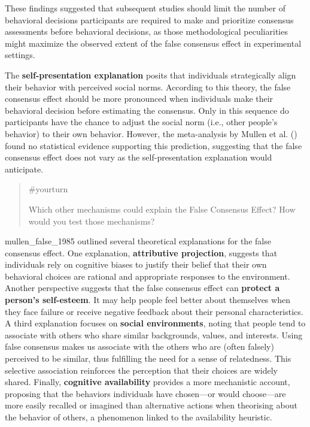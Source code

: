\documentclass[
  letterpaper,
]{book}
\begin{document}
These findings suggested that subsequent studies should limit the number
of behavioral decisions participants are required to make and prioritize
consensus assessments before behavioral decisions, as those
methodological peculiarities might maximize the observed extent of the
false consensus effect in experimental settings.

The \textbf{self-presentation explanation} posits that individuals
strategically align their behavior with perceived social norms.
According to this theory, the false consensus effect should be more
pronounced when individuals make their behavioral decision before
estimating the consensus. Only in this sequence do participants have the
chance to adjust the social norm (i.e., other people's behavior) to
their own behavior. However, the meta-analysis by Mullen et al.
() found no statistical evidence
supporting this prediction, suggesting that the false consensus effect
does not vary as the self-presentation explanation would anticipate.

\begin{quote}
{\#yourturn}

Which other mechanisms could explain the False Consensus Effect? How
would you test those mechanisms?
\end{quote}

mullen\_false\_1985 outlined several theoretical explanations for the
false consensus effect. One explanation, \textbf{attributive
projection}, suggests that individuals rely on cognitive biases to
justify their belief that their own behavioral choices are rational and
appropriate responses to the environment. Another perspective suggests
that the false consensus effect can \textbf{protect a person's
self-esteem}. It may help people feel better about themselves when they
face failure or receive negative feedback about their personal
characteristics. A third explanation focuses on \textbf{social
environments}, noting that people tend to associate with others who
share similar backgrounds, values, and interests. Using false consensus
makes us associate with the others who are (often falsely) perceived to
be similar, thus fulfilling the need for a sense of relatedness. This
selective association reinforces the perception that their choices are
widely shared. Finally, \textbf{cognitive availability} provides a more
mechanistic account, proposing that the behaviors individuals have
chosen---or would choose---are more easily recalled or imagined than
alternative actions when theorising about the behavior of others, a
phenomenon linked to the availability heuristic.
\end{document}
